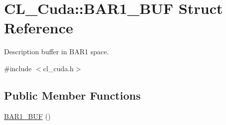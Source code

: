 \hypertarget{structCL__Cuda_1_1BAR1__BUF}{
\section{CL\_\-Cuda::BAR1\_\-BUF Struct Reference}
\label{structCL__Cuda_1_1BAR1__BUF}
}


Description buffer in BAR1 space.  


{\ttfamily \#include $<$cl\_\-cuda.h$>$}\subsection*{Public Member Functions}
\begin{DoxyCompactItemize}
\item 
\hyperlink{structCL__Cuda_1_1BAR1__BUF_ace364e1455d4dfcd2e45ab70e310ed6a}{BAR1\_\-BUF} ()
\end{DoxyCompactItemize}
